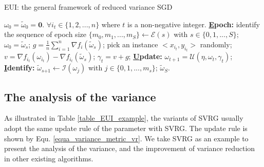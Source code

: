 \documentclass[letterpaper]{article}
\begin{document}
\begin{algorithm}[t]
    \caption{EUI: the general framework of  reduced variance SGD}
    \label{algorithm_EUI}
    \begin{algorithmic}[1]
        \Require $\omega_0\mathrm{=}\tilde{\omega}_0\mathrm{=}\mathbf{0}$. $\forall i_t\mathrm{\in}\{1,2, ..., n\}$ where $t$ is a non-negative integer.
        \State \textbf{\uline{E}poch:} identify the sequence of  epoch size $\{m_0, m_1, ..., m_S\}\mathrm{\leftarrow} \mathcal{E}(s)$ with $s\in\{0,1, ..., S\}$;
            \State $\omega_0=\tilde{\omega}_s$;
            \State $g=\frac{1}{n}\sum\limits_{i=1}^n\nabla f_i(\tilde{\omega}_s)$;
                \State pick an instance $\mathrm{<}x_{i_t}, y_{i_t}\mathrm{>}$ randomly;
                \State  $v=\nabla f_{i_t}(\omega_{i_t})-\nabla f_{i_t}(\tilde{\omega}_s)$;
                \State $\gamma_{t}=v+g$;
                \State \textbf{\uline{U}pdate:} $\omega_{t+1}=\mathcal{U}(\eta, \omega_{t}, \gamma_{t})$;
            \EndFor
            \State \textbf{\uline{I}dentify:} $\tilde{\omega}_{s\mathrm{+}1}\mathrm{\leftarrow}\mathcal{I}(\omega_j)$ with $j\mathrm{\in}\{0,1, ..., m_s\}$;
        \EndFor
        \Return $\tilde{\omega}_S$.
    \end{algorithmic}
\end{algorithm}




\subsection{The analysis of the variance}
\label{subsect_variance_analysis}
As illustrated  in Table \ref{table_EUI_example},  the variants of SVRG  usually adopt the same update rule of the parameter with SVRG. The update rule is shown by Equ. \ref{equa_variance_metric_vr}. We take SVRG  as an example to present the analysis of the variance, and the improvement of variance reduction in other existing algorithms.
\end{document}
